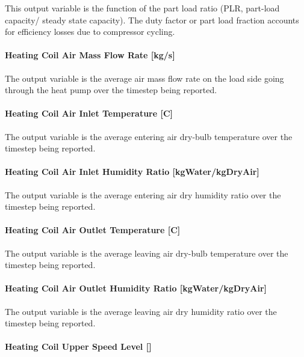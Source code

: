 This output variable is the function of the part load ratio (PLR, part-load capacity/ steady state capacity). The duty factor or part load fraction accounts for efficiency losses due to compressor cycling.

\paragraph{Heating Coil Air Mass Flow Rate {[}kg/s{]}}\label{heating-coil-air-mass-flow-rate-kgs}

The output variable is the average air mass flow rate on the load side going through the heat pump over the timestep being reported.

\paragraph{Heating Coil Air Inlet Temperature {[}C{]}}\label{heating-coil-air-inlet-temperature-c}

The output variable is the average entering air dry-bulb temperature over the timestep being reported.

\paragraph{Heating Coil Air Inlet Humidity Ratio {[}kgWater/kgDryAir{]}}\label{heating-coil-air-inlet-humidity-ratio-kgwaterkgdryair}

The output variable is the average entering air dry humidity ratio over the timestep being reported.

\paragraph{Heating Coil Air Outlet Temperature {[}C{]}}\label{heating-coil-air-outlet-temperature-c}

The output variable is the average leaving air dry-bulb temperature over the timestep being reported.

\paragraph{Heating Coil Air Outlet Humidity Ratio {[}kgWater/kgDryAir{]}}\label{heating-coil-air-outlet-humidity-ratio-kgwaterkgdryair}

The output variable is the average leaving air dry humidity ratio over the timestep being reported.

\paragraph{\texorpdfstring{Heating Coil Upper Speed Level {[]}}{Heating Coil Upper Speed Level }}\label{heating-coil-upper-speed-level}

